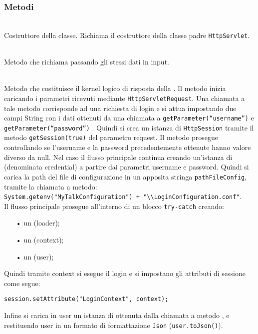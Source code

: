 \subsubsection*{Metodi}
\begin{description}
	\item{}\\
	Costruttore della classe. Richiama il costruttore della classe padre \texttt{HttpServlet}.
	
	\item{}\\
	Metodo che richiama  passando gli stessi dati in input.
	
	\item{}\\

Metodo che costituisce il kernel logico di risposta della . Il metodo inizia caricando i parametri ricevuti mediante \texttt{HttpServletRequest}. Una chiamata a tale metodo corrisponde ad una richiesta di login e si attua impostando due campi String con i dati ottenuti da una chiamata a \texttt{getParameter(``username'')} e \texttt{getParameter(``password'')} . Quindi si crea un istanza di \texttt{HttpSession} tramite il metodo \texttt{getSession(true)} del parametro request. Il metodo prosegue controllando se l'username e la password precedentemente ottenute hanno valore diverso da null. Nel caso il flusso principale continua creando un'istanza di  (denominata credential) a partire dai parametri username e password. Quindi si carica la path del file di configurazione in un apposita stringa \texttt{pathFileConfig}, tramite la chiamata a metodo:\\
	
\verb|System.getenv("MyTalkConfiguration") + "\\LoginConfiguration.conf"|.\\

Il flusso principale prosegue all'interno di un blocco \texttt{try-catch} creando:
	\begin{itemize}
		\item[•] un  (loader);
		\item[•] un  (context);
		\item[•] un  (user);
	\end{itemize}
Quindi tramite context si esegue il login e si impostano gli attributi di sessione come segue: 

\texttt{session.setAttribute("LoginContext", context);}

Infine si carica in user un istanza di  ottenuta dalla chiamata a metodo , e restituendo user in un formato di formattazione \texttt{Json} (\texttt{user.toJson()}).

\end{description}

